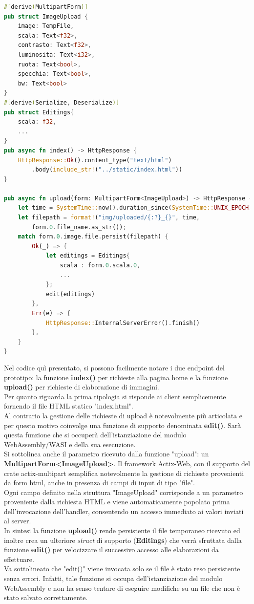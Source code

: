 \begin{lstlisting}[language=Rust,caption={Operazioni principali presenti nel file handlers.rs}, showstringspaces=false]
#[derive(MultipartForm)]
pub struct ImageUpload {
    image: TempFile,
    scala: Text<f32>,
    contrasto: Text<f32>,
    luminosita: Text<i32>,
    ruota: Text<bool>,
    specchia: Text<bool>,
    bw: Text<bool>
}
#[derive(Serialize, Deserialize)]
pub struct Editings{
    scala: f32,
    ...
}
pub async fn index() -> HttpResponse {
    HttpResponse::Ok().content_type("text/html")
        .body(include_str!("../static/index.html"))
}

pub async fn upload(form: MultipartForm<ImageUpload>) -> HttpResponse {
    let time = SystemTime::now().duration_since(SystemTime::UNIX_EPOCH);
    let filepath = format!("img/uploaded/{:?}_{}", time, 
        form.0.file_name.as_str());
    match form.0.image.file.persist(filepath) {
        Ok(_) => {
            let editings = Editings{
                scala : form.0.scala.0,
                ...
            };
            edit(editings)
        },
        Err(e) => {
            HttpResponse::InternalServerError().finish()
        },
    }
}
\end{lstlisting}
Nel codice quì presentato, si possono facilmente notare i due endpoint del prototipo: la funzione \textbf{index()} per richieste alla pagina home e la funzione \textbf{upload()} per richieste di elaborazione di immagini.
\\Per quanto riguarda la prima tipologia si risponde ai client semplicemente fornendo il file HTML statico "index.html".
\\Al contrario la gestione delle richieste di upload è notevolmente più articolata e per questo motivo coinvolge una funzione di supporto denominata \textbf{edit()}. Sarà questa funzione che si occuperà dell'istanziazione del modulo WebAssembly/WASI e della sua esecuzione.
\\Si sottolinea anche il parametro ricevuto dalla funzione "upload": un \textbf{MultipartForm<ImageUpload>}.
Il framework Actix-Web, con il supporto del crate actix-multipart semplifica notevolmente la gestione di richieste provenienti da form html, anche in presenza di campi di input di tipo "file".
\\Ogni campo definito nella struttura "ImageUpload" corrisponde a un parametro proveniente dalla richiesta HTML e viene automaticamente popolato prima dell'invocazione dell'handler, consentendo un accesso immediato ai valori inviati al server.
\\In sintesi la funzione \textbf{upload()} rende persistente il file temporaneo ricevuto ed inoltre crea un ulteriore \emph{struct} di supporto (\textbf{Editings}) che verrà sfruttata dalla funzione \textbf{edit()} per velocizzare il successivo accesso alle elaborazioni da effettuare.
\\Va sottolineato che "edit()" viene invocata solo se il file è stato reso persistente senza errori. Infatti, tale funzione si occupa dell'istanziazione del modulo WebAssembly e non ha senso tentare di eseguire modifiche su un file che non è stato salvato correttamente.
\newpage

